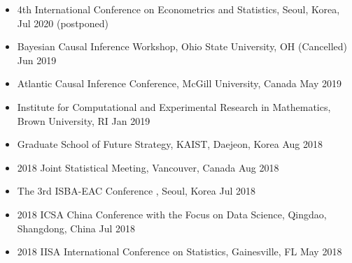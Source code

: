 \documentclass[10pt]{article}
\newenvironment{innerlist}[1][\enskip\textbullet]%
        {\begin{itemize}[#1,leftmargin=*,parsep=0pt,itemsep=0pt,topsep=0pt,partopsep=0pt]}
        {\end{itemize}}
\begin{document}
\begin{innerlist}
\item[] 4th International Conference on Econometrics and Statistics, Seoul, Korea, \hfill Jul 2020 (postponed)\\
\item[] Bayesian Causal Inference Workshop, Ohio State University, OH (Cancelled) \hfill Jun 2019\\
\item[] Atlantic Causal Inference Conference, McGill University, Canada \hfill May 2019\\
\item[] Institute for Computational and Experimental Research in Mathematics, Brown University, RI \hfill Jan 2019\\
\item[] Graduate School of Future Strategy, KAIST, Daejeon, Korea \hfill Aug 2018\\
\item[] 2018 Joint Statistical Meeting, Vancouver, Canada \hfill Aug 2018\\
\item[] The 3rd ISBA-EAC Conference , Seoul, Korea \hfill Jul 2018\\
\item[] 2018 ICSA China Conference with the Focus on Data Science, Qingdao, Shangdong, China \hfill Jul 2018\\
\item[] 2018 IISA International Conference on Statistics, Gainesville, FL
  \hfill May 2018\\

\end{innerlist}
\end{document}
